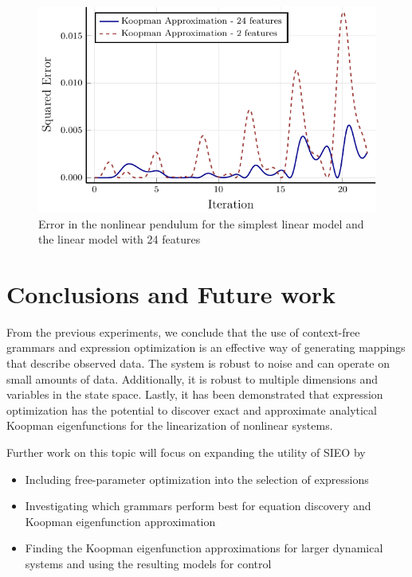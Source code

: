 \documentclass{article}
\begin{document}
\begin{figure}
\vskip 0.2in
\begin{center}
\centerline{\includegraphics[width=\columnwidth]{./figures/pendulum}}
\caption{Error in the nonlinear pendulum for the simplest linear model and the linear model with 24 features}
\label{fig:pendulum}
\end{center}
\vskip -0.2in
\end{figure}

\section{Conclusions and Future work}
\label{conclusion}

From the previous experiments, we conclude that the use of context-free grammars and expression optimization is an effective way of generating mappings that describe observed data. The system is robust to noise and can operate on small amounts of data. Additionally, it is robust to multiple dimensions and variables in the state space. Lastly, it has been demonstrated that expression optimization has the potential to discover exact and approximate analytical Koopman eigenfunctions for the linearization of nonlinear systems. 

Further work on this topic will focus on expanding the utility of SIEO by 
\begin{itemize}
\item Including free-parameter optimization into the selection of expressions
\item Investigating which grammars perform best for equation discovery and Koopman eigenfunction approximation
\item Finding the Koopman eigenfunction approximations for larger dynamical systems and using the resulting models for control

\end{itemize}







\end{document}
